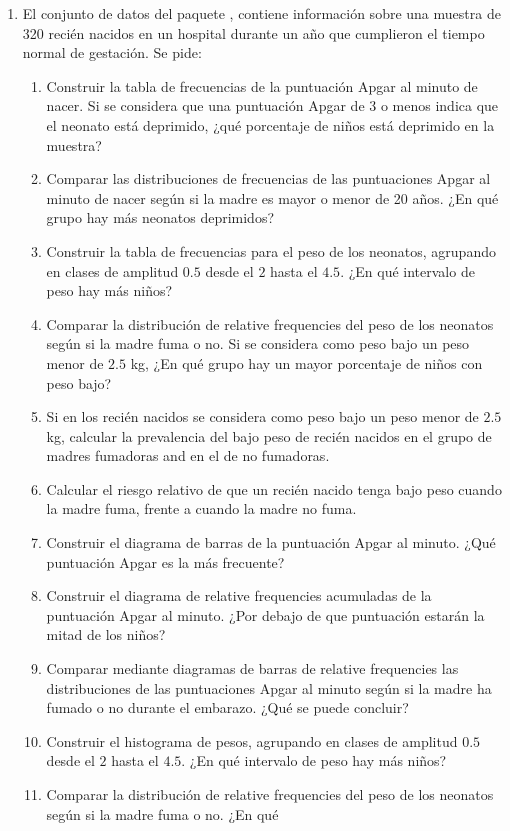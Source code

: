 \begin{enumerate}[leftmargin=*]
\item El conjunto de datos  del paquete , contiene información sobre una
muestra de 320 recién nacidos en un hospital durante un año que cumplieron el tiempo normal de gestación. 
Se pide:
\begin{enumerate}
\item Construir la tabla de frecuencias de la puntuación Apgar al minuto de nacer. 
Si se considera que una puntuación Apgar de 3 o menos indica que el neonato está deprimido, ¿qué porcentaje de niños está deprimido en la muestra?
\item Comparar las distribuciones de frecuencias de las puntuaciones Apgar al minuto de nacer según si la madre es mayor
o menor de 20 años.
¿En qué grupo hay más neonatos deprimidos?
\item Construir la tabla de frecuencias para el peso de los neonatos, agrupando en clases de amplitud $0.5$ desde el
$2$ hasta el $4.5$. ¿En qué intervalo de peso hay más niños?
\item Comparar la distribución de relative frequencies del peso de los neonatos según si la madre fuma o no. Si se
considera como peso bajo un peso menor de $2.5$ kg, ¿En qué grupo hay un mayor porcentaje de niños con peso bajo?
\item Si en los recién nacidos se considera como peso bajo un peso menor de $2.5$ kg, calcular la prevalencia del bajo
peso de recién nacidos en el grupo de madres fumadoras and en el de no fumadoras. 
\item Calcular el riesgo relativo de que un recién nacido tenga bajo peso cuando la madre fuma, frente a cuando la madre
no fuma. 
\item Construir el diagrama de barras de la puntuación Apgar al minuto. ¿Qué puntuación Apgar es la más frecuente? 
\item Construir el diagrama de relative frequencies acumuladas de la puntuación Apgar al minuto. ¿Por debajo de que puntuación estarán la mitad de los niños?
\item Comparar mediante diagramas de barras de relative frequencies las distribuciones de las puntuaciones Apgar al
minuto según si la madre ha fumado o no durante el embarazo. ¿Qué se puede concluir?
\item Construir el histograma de pesos, agrupando en clases de amplitud $0.5$ desde el $2$ hasta el $4.5$. ¿En qué
intervalo de peso hay más niños?
\item Comparar la distribución de relative frequencies del peso de los neonatos según si la madre fuma o no. ¿En qué

\end{enumerate}
\end{enumerate}
